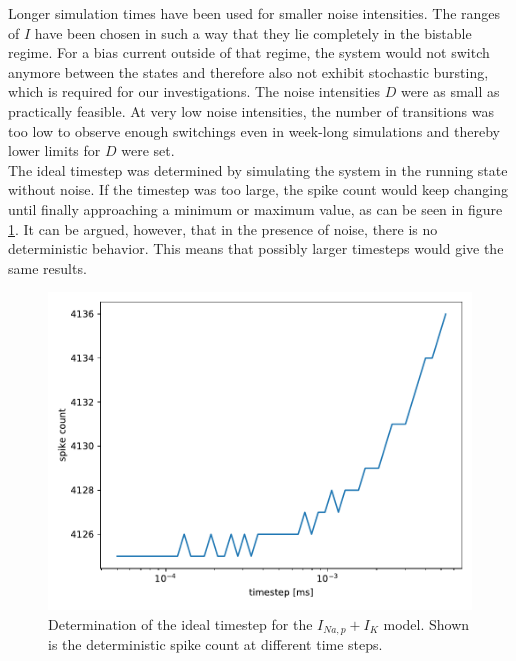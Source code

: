 \documentclass[12pt,a4paper]{article}
\begin{document}
Longer simulation times have been used for smaller noise intensities. The ranges of $I$ have been chosen in such a way that they lie completely in the bistable regime. For a bias current outside of that regime, the system would not switch anymore between the states and therefore also not exhibit stochastic bursting, which is required for our investigations. The noise intensities $D$ were as small as practically feasible. At very low noise intensities, the number of transitions was too low to observe enough switchings even in week-long simulations and thereby lower limits for $D$ were set.\\The ideal timestep was determined by simulating the system in the running state without noise. If the timestep was too large, the spike count would keep changing until finally approaching a minimum or maximum value, as can be seen in figure \ref{dtanhopf}. It can be argued, however, that in the presence of noise, there is no deterministic behavior. This means that possibly larger timesteps would give the same results.
\begin{figure}[H]
	\centering
	\includegraphics[scale=0.9]{detmotimeanhopf4.pdf}\caption{Determination of the ideal timestep for the $I_{Na,p}+I_K$ model. Shown is the deterministic spike count at different time steps.}
	\label{dtanhopf}
\end{figure}
\end{document}
